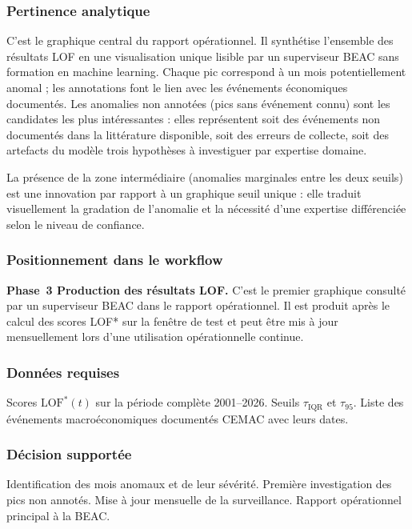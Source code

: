 \documentclass[12pt,a4paper]{article}
\begin{document}
\subsubsection{Pertinence analytique}

C'est le graphique central du rapport opérationnel. Il synthétise
l'ensemble des résultats LOF en une visualisation unique lisible par un
superviseur BEAC sans formation en machine learning. Chaque pic correspond
à un mois potentiellement anomal ; les annotations font le lien avec les
événements économiques documentés. Les anomalies non annotées (pics sans
événement connu) sont les candidates les plus intéressantes : elles
représentent soit des événements non documentés dans la littérature
disponible, soit des erreurs de collecte, soit des artefacts du modèle 
trois hypothèses à investiguer par expertise domaine.

La présence de la zone intermédiaire (anomalies marginales entre les deux
seuils) est une innovation par rapport à un graphique seuil unique : elle
traduit visuellement la gradation de l'anomalie et la nécessité d'une
expertise différenciée selon le niveau de confiance.

\subsubsection{Positionnement dans le workflow}

\textbf{Phase~3  Production des résultats LOF.} C'est le premier
graphique consulté par un superviseur BEAC dans le rapport opérationnel.
Il est produit après le calcul des scores LOF* sur la fenêtre de test et
peut être mis à jour mensuellement lors d'une utilisation opérationnelle
continue.

\subsubsection{Données requises}

Scores $\mathrm{LOF}^*(t)$ sur la période complète 2001--2026.
Seuils $\tau_{\mathrm{IQR}}$ et $\tau_{95}$. Liste des événements
macroéconomiques documentés CEMAC avec leurs dates.

\subsubsection{Décision supportée}

Identification des mois anomaux et de leur sévérité. Première investigation
des pics non annotés. Mise à jour mensuelle de la surveillance. Rapport
opérationnel principal à la BEAC.
\end{document}
